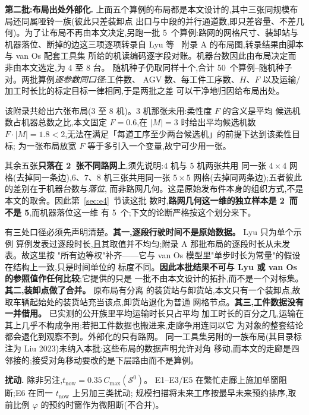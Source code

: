 \documentclass[manuscript,screen,review]{acmart}
\newcommand{\NPubInst}{5}
\newcommand{\NPubPairs}{50}
\newcommand{\NPubNets}{2}
\begin{document}
\textbf{第二批:布局出处外部化.}
上面五个算例的布局都是本文设计的,其中三张同规模布局还同属哑铃一族(彼此只差装卸点
出口与中段的并行通道数,即只差容量、不差几何)。为了让布局不再由本文决定,另跑一批
\NPubInst\ 个算例:路网的网格尺寸、装卸站与机器落位、断掉的边这三项逐项转录自
Lyu 等~\cite{lyu2019approach} 附录 A 的布局图,转录结果由脚本与 van Os 配套工具集
所给的机读编码逐字段对账。机器台数因此由布局决定而非由本文选定,为 \(4\) 至 \(8\) 台。
随机种子仍取同样十个,合计 \NPubPairs\ 个算例--随机种子对。两批算例\emph{逐参数同口径}:工件数、
AGV 数、每工件工序数、\(H\)、\(F\) 以及运输/加工时长比的标定目标一律相同,于是两批之差
可以干净地归因给布局出处。

该附录共给出六张布局(\(3\) 至 \(8\) 机)。\(3\) 机那张未用:柔性度 \(F\) 的含义是平均
候选机数占机器总数之比,本文固定 \(F=0.6\),在 \(|M|=3\) 时给出平均候选机数
\(F\cdot|M|=1.8<2\),无法在满足「每道工序至少两台候选机」的前提下达到该柔性目标;
为一张布局放宽 \(F\) 等于多引入一个变量,故宁可少用一张。

其余五张\textbf{只落在 \NPubNets\ 张不同路网上},须先说明:\(4\) 机与 \(5\) 机两张共用
同一张 \(4\times 4\) 网格(去掉同一条边),\(6\)、\(7\)、\(8\) 机三张共用同一张
\(5\times 5\) 网格(去掉同两条边);五者彼此的差别在于机器台数与\emph{落位},
而非路网几何。这是原始发布件本身的组织方式,不是本文的取舍。因此第~\ref{sec:e4}~节读这批
数时,\textbf{路网几何这一维的独立样本是 \NPubNets\ 而不是 \NPubInst},而机器落位这一维
有 \NPubInst\ 个;下文的论断严格按这个划分来下。

有三处口径必须先声明清楚。\textbf{其一,逐段行驶时间不是原始数据。} Lyu 只为单个示例
算例发表过逐段时长,且其取值并不均匀;附录 A 那批布局的逐段时长从未发表。故这里按
"所有边等权"补齐——它与 van Os 模型里"单步时长为常量"的假设在结构上一致,只是时间单位的
标度不同。\textbf{因此本批结果不可与 Lyu 或 van Os 的参照值作任何比较};它提供的只是
一批不由本文设计的拓扑,而不是一个对标集。\textbf{其二,装卸点做了合并。} 原布局有分离
的装货站与卸货站,本文只有一个装卸点,故取车辆起始处的装货站充当该点,卸货站退化为普通
网格节点。\textbf{其三,工件数据没有一并借用。} 已实测的公开族里平均运输时长只占平均
加工时长的百分之几,运输在其上几乎不构成争用;若把工件数据也搬进来,走廊争用连同以它
为对象的整套结论都会退化到观察不到。外部化的只有路网。
同一工具集另附的一族布局(其目录标注为 Liu 2023)未纳入本批:这些布局的数据声明允许对角
移动,而本文的走廊是四邻接的;接受对角移动要改的是下层路由而不是算例。

\textbf{扰动.}
除非另注,\(t_{\mathrm{now}}=0.35\,C_{\max}(\mathcal{S}^0)\)。
E1--E3/E5 在繁忙走廊上施加单窗阻断;E6 在同一 \(t_{\mathrm{now}}\) 上另加三类扰动;
规模扫描将未来工序按最早未来预约排序,取前比例 \(\varphi\) 的预约时窗作为微阻断(不合并)。
\end{document}
